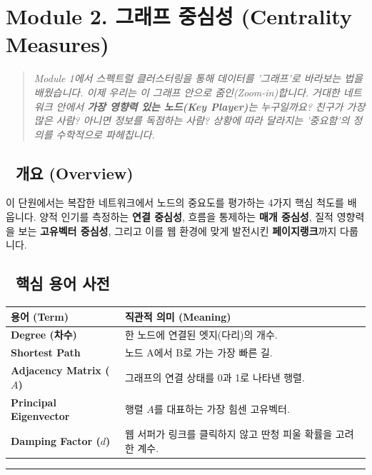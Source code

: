\documentclass[11pt,a4paper]{book}
\theoremstyle{definition}
\begin{document}
\section{Module 2. 그래프 중심성 (Centrality Measures)}

\begin{quote}
\textit{Module 1에서 스펙트럴 클러스터링을 통해 데이터를 '그래프'로 바라보는 법을 배웠습니다. 이제 우리는 이 그래프 안으로 줌인(Zoom-in)합니다. 거대한 네트워크 안에서 \textbf{가장 영향력 있는 노드(Key Player)}는 누구일까요? 친구가 가장 많은 사람? 아니면 정보를 독점하는 사람? 상황에 따라 달라지는 '중요함'의 정의를 수학적으로 파헤칩니다.}
\end{quote}

\subsection*{📌 개요 (Overview)}
이 단원에서는 복잡한 네트워크에서 노드의 중요도를 평가하는 4가지 핵심 척도를 배웁니다. 양적 인기를 측정하는 \textbf{연결 중심성}, 흐름을 통제하는 \textbf{매개 중심성}, 질적 영향력을 보는 \textbf{고유벡터 중심성}, 그리고 이를 웹 환경에 맞게 발전시킨 \textbf{페이지랭크}까지 다룹니다.

\subsection*{📝 핵심 용어 사전}
\begin{table}[h]
\centering
\begin{tabularx}{\textwidth}{|p{}|X|}
\hline
\textbf{용어 (Term)} & \textbf{직관적 의미 (Meaning)} \\
\hline
\textbf{Degree (차수)} & 한 노드에 연결된 엣지(다리)의 개수. \\
\hline
\textbf{Shortest Path} & 노드 A에서 B로 가는 가장 빠른 길. \\
\hline
\textbf{Adjacency Matrix ($A$)} & 그래프의 연결 상태를 0과 1로 나타낸 행렬. \\
\hline
\textbf{Principal Eigenvector} & 행렬 $A$를 대표하는 가장 힘센 고유벡터. \\
\hline
\textbf{Damping Factor ($d$)} & 웹 서퍼가 링크를 클릭하지 않고 딴청 피울 확률을 고려한 계수. \\
\hline
\end{tabularx}
\end{table}

\vspace{0.5cm}\hrule\vspace{0.5cm}
\end{document}
